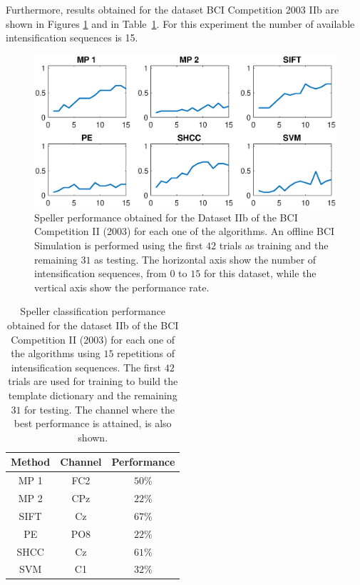 \documentclass[brainsci,article,submit,moreauthors,pdftex,10pt,a4paper]{mdpi}
\begin{document}
Furthermore, results obtained for the dataset BCI Competition 2003 IIb are shown in Figures \ref{fig:performancebcicompetition} and in Table~\ref{tab:bcicompetitionresults}.  For this experiment the number of available intensification sequences is 15.

\begin{figure}[H]
\centering
\includegraphics[width=15cm]{images/PerformanceBCICompetition.eps}
\caption{Speller performance obtained for the Dataset IIb of the BCI Competition II (2003) for each one of the algorithms.  An offline BCI Simulation is performed using the first $42$ trials as training and the remaining $31$ as testing.  The horizontal axis show the number of intensification sequences, from $0$ to $15$ for this dataset, while the vertical axis show the performance rate.}
\label{fig:performancebcicompetition}
\end{figure}


\begin{table}[H]
\caption{Speller classification performance obtained for the dataset IIb of the BCI Competition II (2003) for each one of the algorithms using $15$ repetitions of intensification sequences. The first $42$ trials are used for training to build the template dictionary and the remaining $31$ for testing. The channel where the best performance is attained, is also shown. }
\centering
\begin{tabular}{ccc}
\toprule
\textbf{Method}	& \textbf{Channel} &  \textbf{Performance} \\
\midrule
MP 1 & FC2  & $50\%$ \\
MP 2 & CPz & $22\%$ \\
SIFT  & Cz & $67\%$ \\
PE     & PO8 & $22\%$ \\
SHCC & Cz & $61\%$ \\
SVM     & C1  & $32\%$ \\
\bottomrule
\end{tabular}
\label{tab:bcicompetitionresults}
\end{table}
\end{document}
